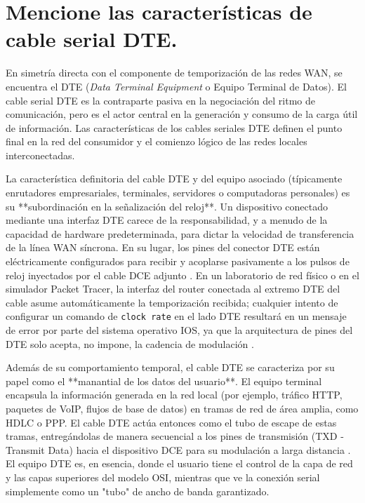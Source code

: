 \documentclass[a4paper,12pt]{article}
\begin{document}
\section{Mencione las características de cable serial DTE.}

En simetría directa con el componente de temporización de las redes WAN, se encuentra el DTE (\textit{Data Terminal Equipment} o Equipo Terminal de Datos). El cable serial DTE es la contraparte pasiva en la negociación del ritmo de comunicación, pero es el actor central en la generación y consumo de la carga útil de información. Las características de los cables seriales DTE definen el punto final en la red del consumidor y el comienzo lógico de las redes locales interconectadas.

La característica definitoria del cable DTE y del equipo asociado (típicamente enrutadores empresariales, terminales, servidores o computadoras personales) es su **subordinación en la señalización del reloj**. Un dispositivo conectado mediante una interfaz DTE carece de la responsabilidad, y a menudo de la capacidad de hardware predeterminada, para dictar la velocidad de transferencia de la línea WAN síncrona. En su lugar, los pines del conector DTE están eléctricamente configurados para recibir y acoplarse pasivamente a los pulsos de reloj inyectados por el cable DCE adjunto \cite{dte_dce_difference, dte_dce_speeds}. En un laboratorio de red físico o en el simulador Packet Tracer, la interfaz del router conectada al extremo DTE del cable asume automáticamente la temporización recibida; cualquier intento de configurar un comando de \texttt{clock rate} en el lado DTE resultará en un mensaje de error por parte del sistema operativo IOS, ya que la arquitectura de pines del DTE solo acepta, no impone, la cadencia de modulación \cite{dte_dce_packet_tracer}.

Además de su comportamiento temporal, el cable DTE se caracteriza por su papel como el **manantial de los datos del usuario**. El equipo terminal encapsula la información generada en la red local (por ejemplo, tráfico HTTP, paquetes de VoIP, flujos de base de datos) en tramas de red de área amplia, como HDLC o PPP. El cable DTE actúa entonces como el tubo de escape de estas tramas, entregándolas de manera secuencial a los pines de transmisión (TXD - Transmit Data) hacia el dispositivo DCE para su modulación a larga distancia \cite{dte_dce_cables, dte_dce_difference}. El equipo DTE es, en esencia, donde el usuario tiene el control de la capa de red y las capas superiores del modelo OSI, mientras que ve la conexión serial simplemente como un "tubo" de ancho de banda garantizado.
\end{document}
